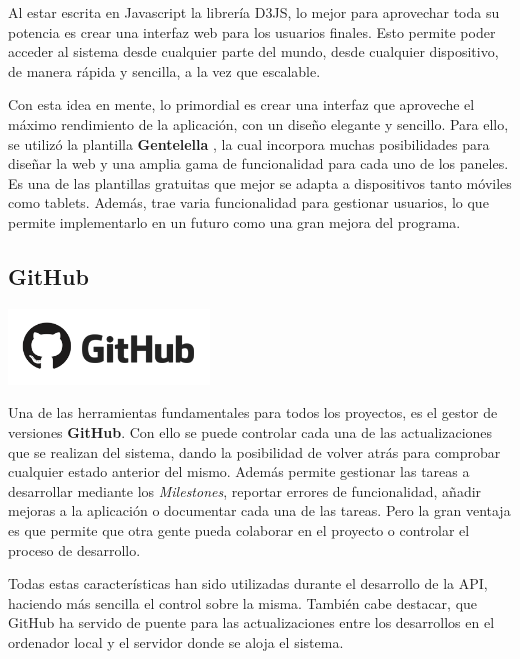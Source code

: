 Al estar escrita en Javascript la librería D3JS, lo mejor para aprovechar toda su potencia es crear una interfaz web para los usuarios finales. Esto permite poder acceder al sistema desde cualquier parte del mundo, desde cualquier dispositivo, de manera rápida y sencilla, a la vez que escalable. 

Con esta idea en mente, lo primordial es crear una interfaz que aproveche el máximo rendimiento de la aplicación, con un diseño elegante y sencillo. Para ello, se utilizó la plantilla \textbf{Gentelella} \cite{GentelellaGithub}, la cual incorpora muchas posibilidades para diseñar la web y una amplia gama de funcionalidad para cada uno de los paneles. 
Es una de las plantillas gratuitas que mejor se adapta a dispositivos tanto móviles como tablets. Además, trae varia funcionalidad para gestionar usuarios, lo que permite implementarlo en un futuro como una gran mejora del programa.


\subsection{GitHub}
\begin{minipage}{\textwidth}
	\centering
	\includegraphics[width=0.4\textwidth]{imagenes/github_logo.png}\\[0.1cm]
\end{minipage}

Una de las herramientas fundamentales para todos los proyectos, es el gestor de versiones \textbf{GitHub}. Con ello se puede controlar cada una de las actualizaciones que se realizan del sistema, dando la posibilidad de volver atrás para comprobar cualquier estado anterior del mismo. Además permite gestionar las tareas a desarrollar mediante los \textit{Milestones}, reportar errores de funcionalidad, añadir mejoras a la aplicación o documentar cada una de las tareas. Pero la gran ventaja es que permite que otra gente pueda colaborar en el proyecto o controlar el proceso de desarrollo. 

Todas estas características han sido utilizadas durante el desarrollo de la API, haciendo más sencilla el control sobre la misma. También cabe destacar, que GitHub ha servido de puente para las actualizaciones entre los desarrollos en el ordenador local y el servidor donde se aloja el sistema.

